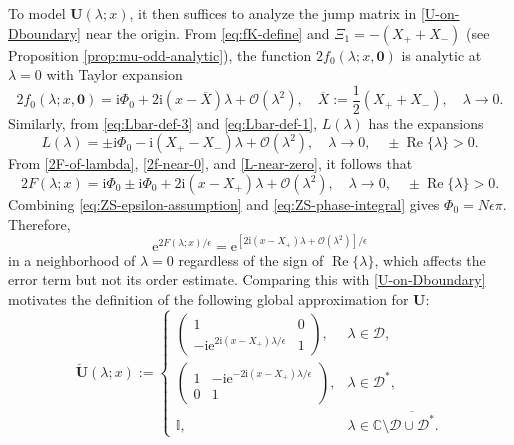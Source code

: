 \documentclass[12pt]{amsart}
\numberwithin{equation}{section}
\newcommand{\ee}{\mathrm{e}}
\newcommand{\ii}{\mathrm{i}}
\newcommand{\SP}{\lambda}
\newcommand{\phaseint}{\Phi}
\newcommand{\tailint}{\Xi}
\newcommand{\bigo}[1]{ \mathcal{O}\! \left( #1 \right) }
\DeclareMathOperator{\re}{Re}
\begin{document}
To model $\mathbf{U}(\SP;x)$, it then suffices to analyze the jump matrix 
in \eqref{U-on-Dboundary} near the origin.  From \eqref{eq:fK-define} and 
$\tailint_1=-(X_++X_-)$ (see Proposition \eqref{prop:mu-odd-analytic}), the 
function $2f_0(\SP;x,\mathbf{0})$ is analytic at $\SP=0$ with Taylor 
expansion
\begin{equation}
2f_0(\SP;x,\mathbf{0})=\ii\phaseint_0  + 2\ii (x-\overline{X})\SP + \bigo{\SP^2},\quad\overline{X}:=\frac{1}{2}(X_++X_-),\quad \SP\to 0.
\label{2f-near-0}
\end{equation}
Similarly, from \eqref{eq:Lbar-def-3} and \eqref{eq:Lbar-def-1}, $L(\SP)$ 
has the expansions
\begin{equation}
L(\SP) = \pm\ii\phaseint_0-\ii(X_+-X_-)\SP+\bigo{\SP^2}, 
\quad \SP\to 0, \quad \pm\re\{\SP\}>0.
\label{L-near-zero}
\end{equation}
From \eqref{2F-of-lambda}, \eqref{2f-near-0}, and \eqref{L-near-zero}, it 
follows that 
\begin{equation}
2F(\SP;x) = \ii\phaseint_0\pm\ii\phaseint_0+2\ii(x-X_+)\SP + \bigo{\SP^2}, 
\quad \SP\to 0, \quad \pm\re\{\SP\}>0.
\label{eq:2F-Taylor}
\end{equation}
Combining \eqref{eq:ZS-epsilon-assumption} and \eqref{eq:ZS-phase-integral} 
gives $\phaseint_0 = N\epsilon\pi$.  Therefore,
\begin{equation}
\ee^{2F(\lambda;x)/\epsilon} = \ee^{[2\ii(x-X_+)\SP+\bigo{\SP^2}]/\epsilon}
\end{equation}
in a neighborhood of $\lambda=0$ regardless of the sign of $\re\{\SP\}$, which affects the error term but not its order estimate.  
Comparing this with \eqref{U-on-Dboundary} motivates the definition of the 
following global approximation for $\mathbf{U}$:
\begin{equation}
\breve{\mathbf{U}}(\SP;x):=\begin{cases}
\begin{pmatrix}1&0\\-\ii \ee^{2\ii(x-X_+)\SP/\epsilon} & 1\end{pmatrix},&\SP\in \mathscr{D},\\
\begin{pmatrix}1&-\ii \ee^{-2\ii (x-X_+)\SP/\epsilon}\\0 & 1\end{pmatrix},&\SP\in \mathscr{D}^*,\\
\mathbb{I},&\SP\in\mathbb{C}\setminus\overline{\mathscr{D}\cup \mathscr{D}^*}.
\end{cases}
\label{eq:N-parametrix-far-outside}
\end{equation}
\end{document}
